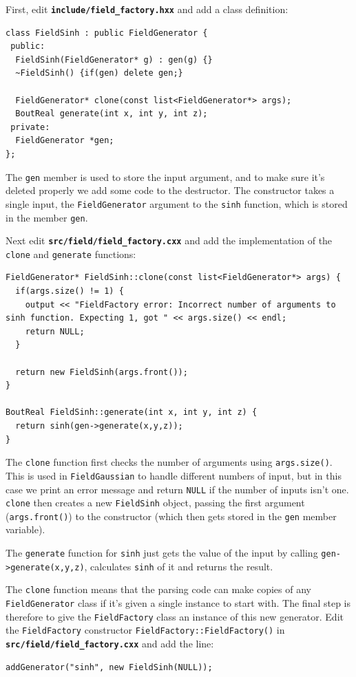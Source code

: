 \documentclass[12pt]{article}
\newcommand{\file}[1]{\texttt{\bf #1}}
\begin{document}
First, edit \file{include/field\_factory.hxx} and add a class definition:
\begin{lstlisting}[firstnumber=122]
class FieldSinh : public FieldGenerator {
 public:
  FieldSinh(FieldGenerator* g) : gen(g) {}
  ~FieldSinh() {if(gen) delete gen;}
  
  FieldGenerator* clone(const list<FieldGenerator*> args);
  BoutReal generate(int x, int y, int z);
 private:
  FieldGenerator *gen;
};
\end{lstlisting}

The \lstinline!gen! member is used to store the input argument, and to make sure it's deleted
properly we add some code to the destructor. The constructor takes a single input, the \lstinline!FieldGenerator! argument to the \lstinline!sinh! function, which is stored in the member \lstinline!gen!.

Next edit \file{src/field/field\_factory.cxx} and add the implementation of the \lstinline!clone! and
\lstinline!generate! functions:
\begin{lstlisting}[firstnumber=100]
FieldGenerator* FieldSinh::clone(const list<FieldGenerator*> args) {
  if(args.size() != 1) {
    output << "FieldFactory error: Incorrect number of arguments to sinh function. Expecting 1, got " << args.size() << endl;
    return NULL;
  }
  
  return new FieldSinh(args.front());
}

BoutReal FieldSinh::generate(int x, int y, int z) {
  return sinh(gen->generate(x,y,z));
}
\end{lstlisting}

The \lstinline!clone! function first checks the number of arguments using \lstinline!args.size()!. This
is used in \lstinline!FieldGaussian! to handle different numbers of input, but in this case we 
print an error message and return \lstinline!NULL! if the number of inputs isn't one. \lstinline!clone! then creates
a new \lstinline!FieldSinh! object, passing the first argument (\lstinline!args.front()!) to the constructor (which
then gets stored in the \lstinline!gen! member variable). 

The \lstinline!generate! function for \lstinline!sinh! just gets the value of the input by calling
\lstinline!gen->generate(x,y,z)!, calculates \lstinline!sinh! of it and returns the result.

The \lstinline!clone! function means that the parsing code can make copies of any \lstinline!FieldGenerator! class
if it's given a single instance to start with. The final step is therefore to give the \lstinline!FieldFactory! 
class an instance of this new generator. Edit the \lstinline!FieldFactory! constructor \lstinline!FieldFactory::FieldFactory()! in \file{src/field/field\_factory.cxx} and add the line:
\begin{lstlisting}[firstnumber=196]
addGenerator("sinh", new FieldSinh(NULL));
\end{lstlisting}
\end{document}

